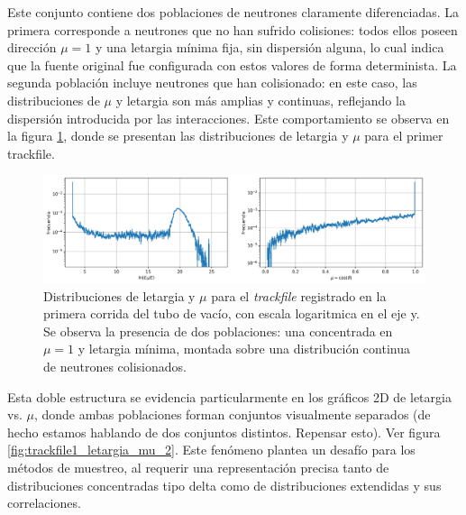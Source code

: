 Este conjunto contiene dos poblaciones de neutrones claramente diferenciadas. La primera corresponde a neutrones que no han sufrido colisiones: todos ellos poseen dirección $\mu = 1$ y una letargia mínima fija, sin dispersión alguna, lo cual indica que la fuente original fue configurada con estos valores de forma determinista. La segunda población incluye neutrones que han colisionado: en este caso, las distribuciones de $\mu$ y letargia son más amplias y continuas, reflejando la dispersión introducida por las interacciones. Este comportamiento se observa en la figura \ref{fig:trackfile1_letargia_mu}, donde se presentan las distribuciones de letargia y $\mu$ para el primer trackfile. 

\begin{figure}[H]
    \centering
    \includegraphics[width=\textwidth]{figs/fig4_2.png}
    \caption{Distribuciones de letargia y $\mu$ para el \emph{trackfile} registrado en la primera corrida del tubo de vacío, con escala logaritmica en el eje y. Se observa la presencia de dos poblaciones: una concentrada en $\mu = 1$ y letargia mínima, montada sobre una distribución continua de neutrones colisionados.}
    \label{fig:trackfile1_letargia_mu}
\end{figure}

Esta doble estructura se evidencia particularmente en los gráficos 2D de letargia vs. $\mu$, donde ambas poblaciones forman conjuntos visualmente separados (de hecho estamos hablando de dos conjuntos distintos. Repensar esto). Ver figura \ref{fig:trackfile1_letargia_mu_2}. Este fenómeno plantea un desafío para los métodos de muestreo, al requerir una representación precisa tanto de distribuciones concentradas tipo delta como de distribuciones extendidas y sus correlaciones.

